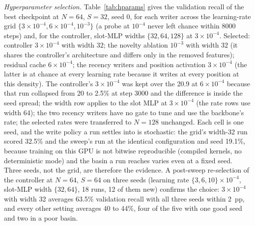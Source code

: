 \documentclass[conference]{IEEEtran}
\begin{document}
\textit{Hyperparameter selection.} Table~\ref{tab:hparams} gives the
validation recall of the best checkpoint at $N = 64$, $S = 32$, seed 0, for
each writer across the learning-rate grid $\{3\times10^{-4}, 6\times10^{-4},
10^{-3}\}$ (a probe at $10^{-4}$ never left chance within 8000 steps) and, for
the controller, slot-MLP widths $\{32, 64, 128\}$ at $3\times10^{-4}$.
Selected: controller $3\times10^{-4}$ with width 32; the novelty ablation
$10^{-3}$ with width 32 (it shares the controller's architecture and
differs only in the removed features); residual cache $6\times10^{-4}$; the
recency writers and position activation $3\times10^{-4}$ (the latter is at
chance at every learning rate because it writes at every position at this
density). The controller's $3 \times 10^{-4}$ was kept over the 20.9 at
$6 \times 10^{-4}$ because that run collapsed from 20 to 2.5\% at step 3000
and the difference is inside the seed spread; the width row applies to the
slot MLP at $3 \times 10^{-4}$ (the rate rows use width 64); the two recency
writers have no gate to tune and use the backbone's rate; the selected rates
were transferred to $N = 128$ unchanged. Each cell is one seed, and the write
policy a run settles into is stochastic: the grid's width-32 run scored 32.5\%
and the sweep's run at the identical configuration and seed 19.1\%, because
training on this GPU is not bitwise reproducible (compiled kernels, no
deterministic mode) and the basin a run reaches varies even at a fixed seed.
Three seeds, not the grid, are therefore the evidence. A post-sweep
re-selection of the controller at $N = 64$, $S = 64$ on three seeds (learning
rate $\{3, 6, 10\} \times 10^{-4}$, slot-MLP width $\{32, 64\}$, 18 runs, 12
of them new) confirms the choice: $3 \times 10^{-4}$ with width 32 averages
63.5\% validation recall with all three seeds within 2~pp, and every other
setting averages 40 to 44\%, four of the five with one good seed and two in a
poor basin.
\end{document}
